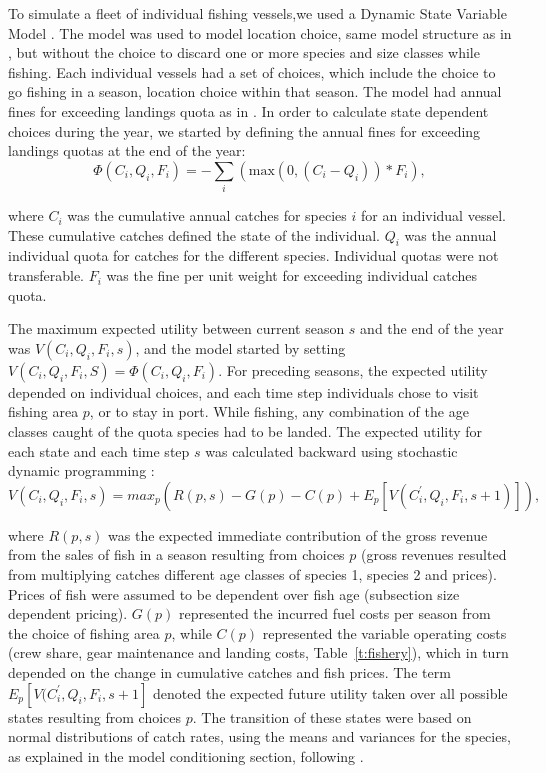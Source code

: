 \documentclass[12pt,oneline,a4paper,numbib]{ouparticle}
\numberwithin{equation}{subsection} %
\begin{document}
To simulate a fleet of individual fishing vessels,we used a Dynamic State Variable Model \cite{Alzorriz2018, Batsleer2015, ClarkandMangel2000, Dowling2011, Houston1999, Poos2010}. The model was used to model location choice, same model structure as in \cite{Alzorriz2018}, but without the choice to discard one or more species and size classes while fishing. Each individual vessels had a set of choices, which include the choice to go fishing in a season, location choice within that season. The model had annual fines for exceeding landings quota as in \cite{Alzorriz2018}. In order to calculate state dependent choices during the year, we started by defining the annual fines for exceeding landings quotas at the end of the year:
\begin{equation}
\Phi (C_i, Q_i, F_i)= -\sum_i (\textrm{max}( 0, (C_i - Q_i))* F_i),
\end{equation}

where $C_i$ was the cumulative annual catches for species $i$ for an individual vessel. These cumulative catches defined the state of the individual. $Q_i$ was the annual individual quota for catches for the different species. Individual quotas were not transferable. $F_i$ was the fine per unit weight for exceeding individual catches quota.

The maximum expected utility between current season $s$ and the end of the year was $V (C_i, Q_i, F_i, s)$, and the model started by setting $V (C_i, Q_i, F_i, S)= \Phi (C_i, Q_i, F_i)$. For preceding seasons, the expected utility depended on individual choices, and each time step individuals chose to visit fishing area $p$, or to stay in port. While fishing, any combination of the age classes caught of the quota species had to be landed. The expected utility for each state and each time step $s$ was calculated backward using stochastic dynamic programming \cite{ClarkandMangel2000}:
\begin{equation}
V (C_i, Q_i, F_i, s) = max_{p}( R(p, s)- G(p) - C(p) + E_{p}[V (C_i^\prime, Q_i, F_i, s+1)]),
\end{equation}

where $R(p, s)$ was the expected immediate contribution of the gross revenue from the sales of fish in a season resulting from choices $p$ (gross revenues resulted from multiplying catches different age classes of species 1, species 2 and prices). Prices of fish were assumed to be dependent over fish age (subsection size dependent pricing). $G(p)$ represented the incurred fuel costs per season from the choice of fishing area $p$, while  $ C(p)$ represented the variable operating costs (crew share, gear maintenance and landing costs, Table~\ref{t:fishery}), which in turn depended on the change in cumulative catches and fish prices. The term $E_{p}[V (C_i^\prime, Q_i, F_i, s+1]$ denoted the expected future utility taken over all possible states resulting from choices $p$. The transition of these states were based on normal distributions of catch rates, using the means and variances for the species, as explained in the model conditioning section, following \cite{Poos2010}.
\end{document}
